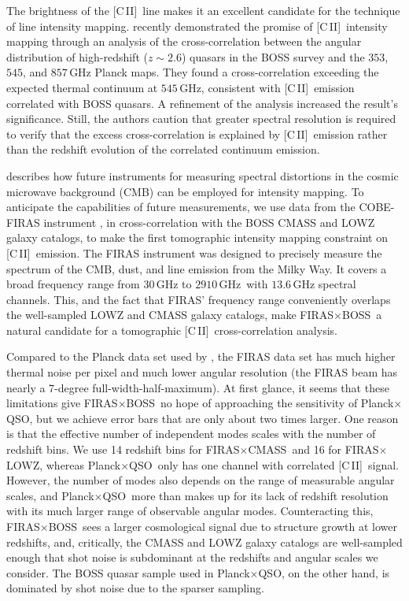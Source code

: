 \documentclass[fleqn,usenatbib]{mnras}
\newcommand{\cii}{[C{\sc\,II}]}
\newcommand{\FB}{FIRAS${\times}$BOSS}
\newcommand{\PB}{Planck${\times}$QSO}
\newcommand{\FLZ}{FIRAS${\times}$LOWZ}
\newcommand{\FC}{FIRAS${\times}$CMASS}
\begin{document}
The brightness of the \cii\ line makes it an excellent candidate for the technique of line intensity mapping. \cite{pullen2018search} recently demonstrated the promise of \cii\ intensity mapping through an analysis of the cross-correlation between the angular distribution of high-redshift ($z {\sim} 2.6$) quasars in the BOSS survey and the $353$, $545$, and $857$\,GHz Planck maps. They found a cross-correlation exceeding the expected thermal continuum at $545$\,GHz, consistent with \cii\ emission correlated with BOSS quasars. A refinement of the analysis \citep{yang2019evidence} increased the result's significance. Still, the authors caution that greater spectral resolution is required to verify that the excess cross-correlation is explained by \cii\ emission rather than the redshift evolution of the correlated continuum emission.

\citet{2017ApJ...838...82S} describes how future instruments for measuring spectral distortions in the cosmic microwave background (CMB) can be employed for intensity mapping. To anticipate the capabilities of future measurements, we use data from the COBE-FIRAS instrument \citep{fixsen1994calibration}, in cross-correlation with the BOSS CMASS and LOWZ galaxy catalogs, to make the first tomographic intensity mapping constraint on \cii\ emission. 
The FIRAS instrument \citep{fixsen1994calibration} was designed to precisely measure the spectrum of the CMB, dust, and line emission from the Milky Way. It covers a broad frequency range from $30$\,GHz to $2910$\,GHz\ with $13.6$\,GHz spectral channels. This, and the fact that FIRAS' frequency range conveniently overlaps the well-sampled LOWZ and CMASS galaxy catalogs, make \FB\, a natural candidate for a tomographic \cii\, cross-correlation analysis. 

Compared to the Planck data set used by \citet{pullen2018search}, the FIRAS data set has much higher thermal noise per pixel and much lower angular resolution (the FIRAS beam has nearly a 7-degree full-width-half-maximum). 
At first glance, it seems that these limitations give \FB\ no hope of approaching the sensitivity of \PB, but we achieve error bars that are only about two times larger. One reason is that the effective number of independent modes scales with the number of redshift bins. We use 14 redshift bins for \FC\ and 16 for \FLZ, whereas \PB\ only has one channel with correlated \cii\ signal. However, the number of modes also depends on the range of measurable angular scales, and \PB\ more than makes up for its lack of redshift resolution with its much larger range of observable angular modes. Counteracting this, \FB\ sees a larger cosmological signal due to structure growth at lower redshifts, and, critically, the CMASS and LOWZ galaxy catalogs are well-sampled enough that shot noise is subdominant at the redshifts and angular scales we consider. The BOSS quasar sample used in \PB, on the other hand, is dominated by shot noise due to the sparser sampling.
\end{document}
